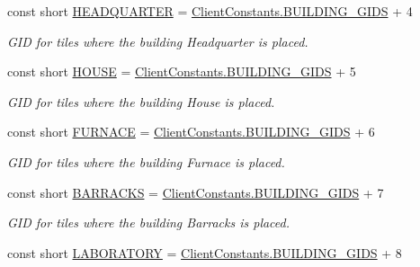 \begin{DoxyCompactItemize}
const short \hyperlink{classClient_1_1Common_1_1Constants_1_1BuildingGid_abd82ad0a2b6ce332d3ac57dd74dcd56d}{H\+E\+A\+D\+Q\+U\+A\+R\+T\+E\+R} = \hyperlink{classClient_1_1Common_1_1Constants_1_1ClientConstants_ad2e944ac733f952d3d0c2e24fe5d14ad}{Client\+Constants.\+B\+U\+I\+L\+D\+I\+N\+G\+\_\+\+G\+I\+D\+S} + 4
\begin{DoxyCompactList}\small\item\em G\+I\+D for tiles where the building Headquarter is placed. \end{DoxyCompactList}\item 
const short \hyperlink{classClient_1_1Common_1_1Constants_1_1BuildingGid_a17b3775a1caa7f32b72bb5a89e03d497}{H\+O\+U\+S\+E} = \hyperlink{classClient_1_1Common_1_1Constants_1_1ClientConstants_ad2e944ac733f952d3d0c2e24fe5d14ad}{Client\+Constants.\+B\+U\+I\+L\+D\+I\+N\+G\+\_\+\+G\+I\+D\+S} + 5
\begin{DoxyCompactList}\small\item\em G\+I\+D for tiles where the building House is placed. \end{DoxyCompactList}\item 
const short \hyperlink{classClient_1_1Common_1_1Constants_1_1BuildingGid_a448960bac471f9527ac2d2c76e5ab8e0}{F\+U\+R\+N\+A\+C\+E} = \hyperlink{classClient_1_1Common_1_1Constants_1_1ClientConstants_ad2e944ac733f952d3d0c2e24fe5d14ad}{Client\+Constants.\+B\+U\+I\+L\+D\+I\+N\+G\+\_\+\+G\+I\+D\+S} + 6
\begin{DoxyCompactList}\small\item\em G\+I\+D for tiles where the building Furnace is placed. \end{DoxyCompactList}\item 
const short \hyperlink{classClient_1_1Common_1_1Constants_1_1BuildingGid_a92c1fa796061adaa161169560abc579c}{B\+A\+R\+R\+A\+C\+K\+S} = \hyperlink{classClient_1_1Common_1_1Constants_1_1ClientConstants_ad2e944ac733f952d3d0c2e24fe5d14ad}{Client\+Constants.\+B\+U\+I\+L\+D\+I\+N\+G\+\_\+\+G\+I\+D\+S} + 7
\begin{DoxyCompactList}\small\item\em G\+I\+D for tiles where the building Barracks is placed. \end{DoxyCompactList}\item 
const short \hyperlink{classClient_1_1Common_1_1Constants_1_1BuildingGid_af25b2eda3f84cab99221aac396193e51}{L\+A\+B\+O\+R\+A\+T\+O\+R\+Y} = \hyperlink{classClient_1_1Common_1_1Constants_1_1ClientConstants_ad2e944ac733f952d3d0c2e24fe5d14ad}{Client\+Constants.\+B\+U\+I\+L\+D\+I\+N\+G\+\_\+\+G\+I\+D\+S} + 8

\end{DoxyCompactItemize}

